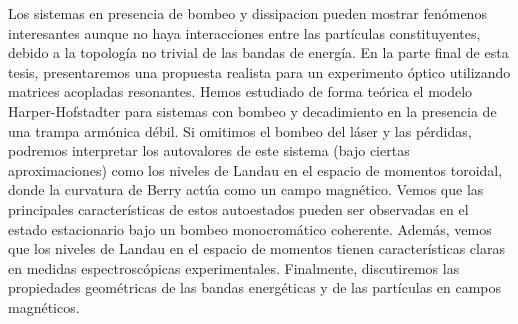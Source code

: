 \documentclass{scrartcl}
\begin{document}
Los sistemas en presencia de bombeo y dissipacion pueden mostrar
fen\'omenos interesantes aunque no haya interacciones entre las
part\'iculas constituyentes, debido a la topolog\'ia no trivial de las
bandas de energ\'ia. En la parte final de esta tesis, presentaremos
una propuesta realista para un experimento \'optico utilizando
matrices acopladas resonantes. Hemos estudiado de forma te\'orica el
modelo Harper-Hofstadter para sistemas con bombeo y decadimiento en
la presencia de una trampa arm\'onica d\'ebil. Si omitimos el bombeo
del l\'aser y las p\'erdidas, podremos interpretar los autovalores de
este sistema (bajo ciertas aproximaciones) como los niveles de Landau
en el espacio de momentos toroidal, donde la curvatura de Berry
act\'ua como un campo magn\'etico. Vemos que las principales
caracter\'isticas de estos autoestados pueden ser observadas en el
estado estacionario bajo un bombeo monocrom\'atico
coherente. Adem\'as, vemos que los niveles de Landau en el espacio de
momentos tienen caracter\'isticas claras en medidas espectrosc\'opicas
experimentales. Finalmente, discutiremos las propiedades geom\'etricas
de las bandas energ\'eticas y de las part\'iculas en campos
magn\'eticos.
\end{document}
